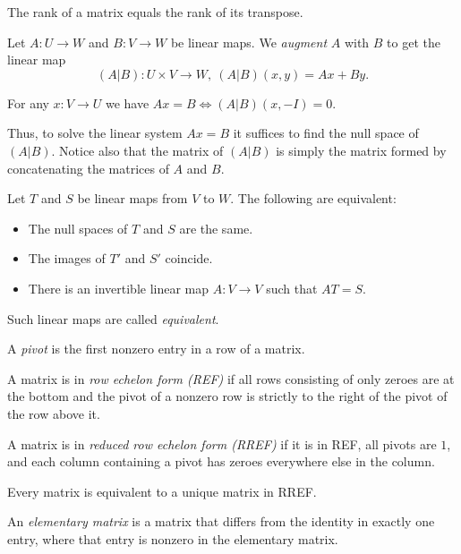 \begin{cor}
  The rank of a matrix equals the rank of its transpose.
\end{cor}
\begin{defn}
  Let $A:U\to W$ and
  $B:V\to W$ be linear maps. We \emph{augment} $A$ with $B$ to get the linear
  map
  \[(A|B):U\times V\to W,\ (A|B)(x,y)=Ax+By.\]
\end{defn}
\begin{prop}
  For any $x:V\to U$ we have $Ax=B\iff (A|B)(x,-I)=0$.
\end{prop}
\begin{rem}
  Thus, to solve the linear system $Ax=B$ it suffices to find the null space of
  $(A|B)$. Notice also that the matrix of $(A|B)$ is simply the matrix formed by
  concatenating the matrices of $A$ and $B$.
\end{rem}
\begin{prop}
  Let $T$ and $S$ be linear maps from $V$ to $W$. The following are equivalent:
  \begin{itemize}
    \item The null spaces of $T$ and $S$ are the same.
    \item The images of $T'$ and $S'$ coincide.
    \item There is an invertible linear map $A:V\to V$ such that $AT=S$.
  \end{itemize}
\end{prop}
\begin{defn}
  Such linear maps are called \emph{equivalent}.
\end{defn}
\begin{defn}
  A \emph{pivot} is the first nonzero entry in a row of a matrix.

  A matrix is in \emph{row echelon form (REF)} if all rows consisting
  of only zeroes are at the bottom and the pivot of a nonzero row is strictly to
  the right of the pivot of the row above it.

  A matrix is in \emph{reduced row echelon form (RREF)} if it is in REF, all
  pivots are $1$, and each column containing a pivot has zeroes everywhere else
  in the column.
\end{defn}
\begin{prop}
  Every matrix is equivalent to a unique matrix in RREF\@.
\end{prop}
\begin{defn}
  An \emph{elementary matrix} is a matrix that differs from the identity 
  in exactly one entry, where that entry is nonzero in the elementary matrix.
\end{defn}
